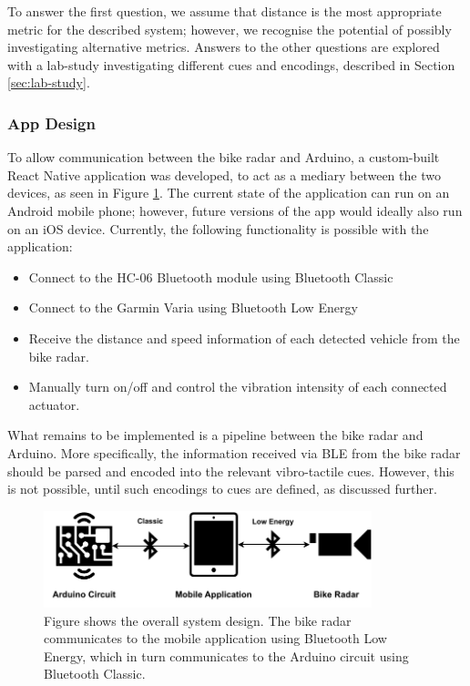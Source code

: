\documentclass{interim}
\begin{document}
To answer the first question, we assume that distance is the most appropriate metric for the described system; however, we recognise the potential of possibly investigating alternative metrics. Answers to the other questions are explored with a lab-study investigating different cues and encodings, described in Section \ref{sec:lab-study}.


\subsubsection{App Design}
To allow communication between the bike radar and Arduino, a custom-built React Native application was developed, to act as a mediary between the two devices, as seen in Figure \ref{fig:overall-system}. The current state of the application can run on an Android mobile phone; however, future versions of the app would ideally also run on an iOS device. Currently, the following functionality is possible with the application:
\begin{itemize}
    \item Connect to the HC-06 Bluetooth module using Bluetooth Classic
    \item Connect to the Garmin Varia using Bluetooth Low Energy
    \item Receive the distance and speed information of each detected vehicle from the bike radar.
    \item Manually turn on/off and control the vibration intensity of each connected actuator.
\end{itemize}

What remains to be implemented is a pipeline between the bike radar and Arduino. More specifically, the information received via BLE from the bike radar should be parsed and encoded into the relevant vibro-tactile cues. However, this is not possible, until such encodings to cues are defined, as discussed further.

\begin{figure}[!ht]
    \centering
    \includegraphics[width=0.85\textwidth]{images/overall-system.pdf}
    \caption{Figure shows the overall system design. The bike radar communicates to the mobile application using Bluetooth Low Energy, which in turn communicates to the Arduino circuit using Bluetooth Classic.}
    \label{fig:overall-system}
\end{figure}
\end{document}
